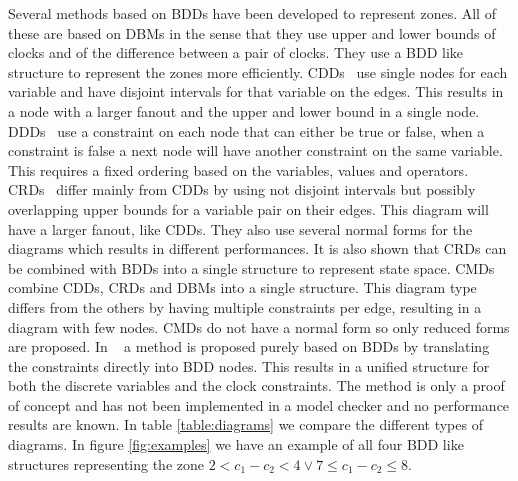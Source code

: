 \documentclass[11pt]{article}
\begin{document}
Several methods based on BDDs have been developed to represent zones. All of these are based on DBMs in the sense that they use upper and lower bounds of clocks and of the difference between a pair of clocks. They use a BDD like structure to represent the zones more efficiently. CDDs~\cite{BRICS19491} use single nodes for each variable and have disjoint intervals for that variable on the edges. This results in a node with a larger fanout and the upper and lower bound in a single node. DDDs~\cite{ddds, ddd-datastructure-99} use a constraint on each node that can either be true or false, when a constraint is false a next node will have another constraint on the same variable. This requires a fixed ordering based on the variables, values and operators. CRDs~\cite{crds} differ mainly from CDDs by using not disjoint intervals but possibly overlapping upper bounds for a variable pair on their edges. This diagram will have a larger fanout, like CDDs. They also use several normal forms for the diagrams which results in different performances. It is also shown that CRDs can be combined with BDDs into a single structure to represent state space. CMDs~\cite{5702245} combine CDDs, CRDs and DBMs into a single structure. This diagram type differs from the others by having multiple constraints per edge, resulting in a diagram with few nodes. CMDs do not have a normal form so only reduced forms are proposed. In ~\cite{7098276, 7184781} a method is proposed purely based on BDDs by translating the constraints directly into BDD nodes. This results in a unified structure for both the discrete variables and the clock constraints. The method is only a proof of concept and has not been implemented in a model checker and no performance results are known. In table \ref{table:diagrams} we compare the different types of diagrams. In figure \ref{fig:examples} we have an example of all four BDD like structures representing the zone $2 < c_1 - c_2 < 4 \vee 7 \leq c_1 - c_2 \leq 8$.
\end{document}
